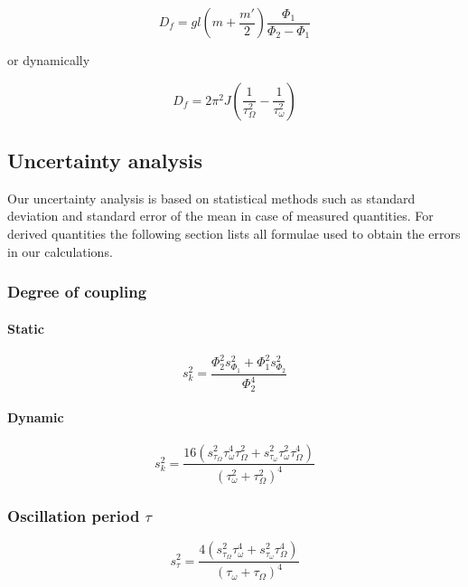 \documentclass{scrreprt}
\begin{document}
\begin{equation} \label{eq:coupling_stat}
D_f = g l \left( m+ \frac{m'}{2} \right) \frac{\Phi_1}{\Phi_2 -\Phi_1}
\end{equation}

or dynamically

\begin{equation} \label{eq:coupling_dyn}
D_f = 2 \pi^2 J \left( \frac{1}{\tau_{\Omega}^2} - \frac{1}{\tau_{\omega}^2}  \right) 
\end{equation}


\subsection{Uncertainty analysis}
Our uncertainty analysis is based on statistical methods such as standard deviation and standard error of the mean in case of measured quantities. For derived quantities the following section lists all formulae used to obtain the errors in our calculations.

\subsubsection{Degree of coupling}
\paragraph*{Static}
\begin{equation}
s_k^2 = \frac{\Phi_2^2 s_{\Phi_1}^2 + \Phi_1^2 s_{\Phi_2}^2}{\Phi_2^4}
\end{equation}

\paragraph*{Dynamic}
\begin{equation}
s_k^2 = \frac{16 \left( s_{\tau_{\Omega}}^2 \tau_{\omega}^4 \tau_{\Omega}^2 + s_{\tau_{\omega}}^2 \tau_{\omega}^2 \tau_{\Omega}^4 \right)}{\left( \tau_{\omega}^2+ \tau_{\Omega}^2 \right)^4}
\end{equation}

\subsubsection{Oscillation period $\tau$}
\begin{equation}
s_{\tau}^2 = \frac{4 \left( s_{\tau_{\Omega}}^2 \tau_{\omega}^4 + s_{\tau_{\omega}}^2 \tau_{\Omega}^4 \right)}{\left( \tau_{\omega}+ \tau_{\Omega} \right)^4}
\end{equation}
\end{document}
